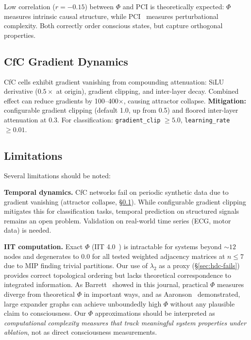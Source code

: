 \documentclass[10pt,letterpaper]{article}
\renewcommand{\Phi}{\varPhi}
\begin{document}
Low correlation ($r = -0.15$) between $\Phi$ and PCI is theoretically expected: $\Phi$~\cite{tononi2004information} measures intrinsic causal structure, while PCI~\cite{casali2013consciousness} measures perturbational complexity. Both correctly order conscious states, but capture orthogonal properties.

\subsection{CfC Gradient Dynamics}
\label{sec:cfc-gradients}

CfC cells exhibit gradient vanishing from compounding attenuation: SiLU derivative ($0.5\times$ at origin), gradient clipping, and inter-layer decay. Combined effect can reduce gradients by 100--400$\times$, causing attractor collapse. \textbf{Mitigation:} configurable gradient clipping (default 1.0, up from 0.5) and floored inter-layer attenuation at 0.3. For classification: \texttt{gradient\_clip} $\geq 5.0$, \texttt{learning\_rate} $\geq 0.01$.

\subsection{Limitations}
\label{sec:limitations}

Several limitations should be noted:

\textbf{Temporal dynamics.} CfC networks fail on periodic synthetic data due to gradient vanishing (attractor collapse, \S\ref{sec:cfc-gradients}). While configurable gradient clipping mitigates this for classification tasks, temporal prediction on structured signals remains an open problem. Validation on real-world time series (ECG, motor data) is needed.

\textbf{IIT computation.} Exact $\Phi$ (IIT 4.0~\cite{albantakis2023iit4}) is intractable for systems beyond ${\sim}12$ nodes and degenerates to 0.0 for all tested weighted adjacency matrices at $n \leq 7$ due to MIP finding trivial partitions. Our use of $\lambda_2$ as a proxy (\S\ref{sec:hdc-fails}) provides correct topological ordering but lacks theoretical correspondence to integrated information. As Barrett~\cite{barrett2015phi} showed in this journal, practical $\Phi$ measures diverge from theoretical $\Phi$ in important ways, and as Aaronson~\cite{aaronson2014phi} demonstrated, large expander graphs can achieve unboundedly high $\Phi$ without any plausible claim to consciousness. Our $\Phi$ approximations should be interpreted as \emph{computational complexity measures that track meaningful system properties under ablation}, not as direct consciousness measurements.
\end{document}
